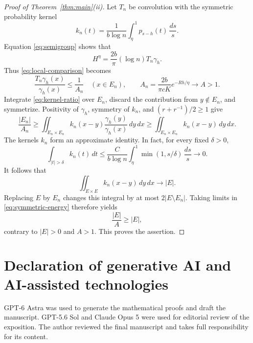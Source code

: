\documentclass[11pt]{article}
\numberwithin{equation}{section}
\begin{document}
\begin{proof}[Proof of Theorem~\ref{thm:main}(ii)]
Let \(T_n\) be convolution with the symmetric probability kernel
\[
 k_n(t)=\frac1{b\log n}\int_\eta^1p_{s-h}(t)\,\frac{ds}{s}.
\]
Equation \eqref{eq:semigroup} shows that
\[
 H^\eta=\frac{2b}{\pi}(\log n)T_n\gamma_h.
\]
Thus \eqref{eq:local-comparison} becomes
\begin{equation}\label{eq:kernel-ratio}
 \frac{T_n\gamma_h(x)}{\gamma_h(x)}\le\frac1{A_n}
 \quad(x\in E_n),\qquad
 A_n=\frac{2b}{\pi cK}e^{-Rh/\eta}\longrightarrow A>1.
\end{equation}
Integrate \eqref{eq:kernel-ratio} over \(E_n\), discard the contribution from
\(y\notin E_n\), and symmetrize. Positivity of \(\gamma_h\), symmetry of
\(k_n\), and \((r+r^{-1})/2\ge1\) give
\begin{equation}\label{eq:symmetric-energy}
 \frac{|E_n|}{A_n}
 \ge\iint_{E_n\times E_n}k_n(x-y)
                  \frac{\gamma_h(y)}{\gamma_h(x)}\,dy\,dx
 \ge\iint_{E_n\times E_n}k_n(x-y)\,dy\,dx.
\end{equation}
The kernels \(k_n\) form an approximate identity. In fact, for every fixed
\(\delta>0\),
\[
 \int_{|t|>\delta}k_n(t)\,dt
 \le\frac{C}{b\log n}\int_\eta^1\min(1,s/\delta)\,\frac{ds}{s}
 \longrightarrow0.
\]
It follows that
\[
 \iint_{E\times E}k_n(x-y)\,dy\,dx\longrightarrow|E|.
\]
Replacing \(E\) by \(E_n\) changes this integral by at most \(2|E\setminus
E_n|\). Taking limits in \eqref{eq:symmetric-energy} therefore yields
\[
 \frac{|E|}{A}\ge|E|,
\]
contrary to \(|E|>0\) and \(A>1\). This proves the assertion.
\end{proof}

\section*{Declaration of generative AI and AI-assisted technologies}

GPT-6 Astra was used to generate the mathematical proofs and draft the
manuscript. GPT-5.6 Sol and Claude Opus 5 were used for editorial review of
the exposition. The author reviewed the final manuscript and takes full
responsibility for its content.
\end{document}
